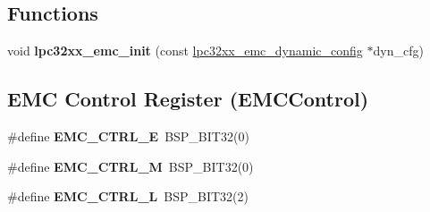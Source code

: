 \subsection*{Functions}
\begin{DoxyCompactItemize}
\item 
\mbox{\label{group__lpc__emc_gab318e14a6a47dcb37728fa516d00a210}} 
void {\bfseries lpc32xx\+\_\+emc\+\_\+init} (const \mbox{\hyperlink{structlpc32xx__emc__dynamic__config}{lpc32xx\+\_\+emc\+\_\+dynamic\+\_\+config}} $\ast$dyn\+\_\+cfg)
\end{DoxyCompactItemize}
\subsection*{E\+MC Control Register (E\+M\+C\+Control)}
\begin{DoxyCompactItemize}
\item 
\mbox{\label{group__lpc__emc_ga1a99600f399ea45136c5698e58fb7d18}} 
\#define {\bfseries E\+M\+C\+\_\+\+C\+T\+R\+L\+\_\+E}~B\+S\+P\+\_\+\+B\+I\+T32(0)
\item 
\mbox{\label{group__lpc__emc_ga199920c98b7f728158c5622bf6f6c60e}} 
\#define {\bfseries E\+M\+C\+\_\+\+C\+T\+R\+L\+\_\+M}~B\+S\+P\+\_\+\+B\+I\+T32(0)
\item 
\mbox{\label{group__lpc__emc_gac899a0637cde6ac60655551fedbb52ee}} 
\#define {\bfseries E\+M\+C\+\_\+\+C\+T\+R\+L\+\_\+L}~B\+S\+P\+\_\+\+B\+I\+T32(2)
\end{DoxyCompactItemize}
